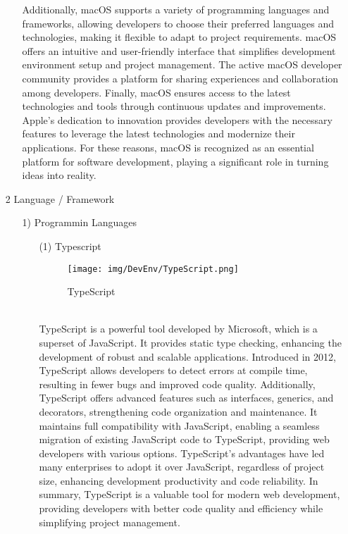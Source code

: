 \documentclass[conference]{IEEEtran}
\begin{document}
\begin{enumerate}
\begin{itemize}
Additionally, macOS supports a variety of programming languages and frameworks, allowing developers to choose their preferred languages and technologies, making it flexible to adapt to project requirements. macOS offers an intuitive and user-friendly interface that simplifies development environment setup and project management. The active macOS developer community provides a platform for sharing experiences and collaboration among developers.
Finally, macOS ensures access to the latest technologies and tools through continuous updates and improvements. Apple's dedication to innovation provides developers with the necessary features to leverage the latest technologies and modernize their applications. For these reasons, macOS is recognized as an essential platform for software development, playing a significant role in turning ideas into reality.
\\
\end{itemize}

\item[2] Language / Framework

\begin{itemize}
\item [1)] Programmin Languages
\begin{itemize}
\item [(1)] Typescript\cite{Typescript}
\begin{figure}[h]
\centering
\texttt{[image: img/DevEnv/TypeScript.png]}
\centering
\caption{TypeScript} 
\end{figure}\\
TypeScript is a powerful tool developed by Microsoft, which is a superset of JavaScript. It provides static type checking, enhancing the development of robust and scalable applications. Introduced in 2012, TypeScript allows developers to detect errors at compile time, resulting in fewer bugs and improved code quality. Additionally, TypeScript offers advanced features such as interfaces, generics, and decorators, strengthening code organization and maintenance. It maintains full compatibility with JavaScript, enabling a seamless migration of existing JavaScript code to TypeScript, providing web developers with various options. TypeScript's advantages have led many enterprises to adopt it over JavaScript, regardless of project size, enhancing development productivity and code reliability. In summary, TypeScript is a valuable tool for modern web development, providing developers with better code quality and efficiency while simplifying project management.\\


\end{itemize}
\end{itemize}
\end{enumerate}
\end{document}

